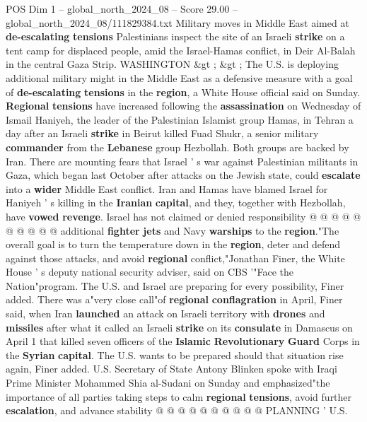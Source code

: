 \begin{textsample}{POS Dim 1 – global\_north\_2024\_08 – Score 29.00 – global\_north\_2024\_08/111829384.txt}  \label{ex:f1_pos_073}
Military moves in Middle East aimed at \textbf{de-escalating} \textbf{tensions} Palestinians inspect the site of an Israeli \textbf{strike} on a tent camp for displaced people, amid the Israel-Hamas conflict, in Deir Al-Balah in the central Gaza Strip.
WASHINGTON \&gt ; \&gt ; The U.S. is deploying additional military might in the Middle East as a defensive measure with a goal of \textbf{de-escalating} \textbf{tensions} in the \textbf{region}, a White House official said on Sunday. \textbf{Regional} \textbf{tensions} have increased following the \textbf{assassination} on Wednesday of Ismail Haniyeh, the leader of the Palestinian Islamist group Hamas, in Tehran a day after an Israeli \textbf{strike} in Beirut killed Fuad Shukr, a senior military \textbf{commander} from the \textbf{Lebanese} group Hezbollah.
Both groups are backed by Iran.
There are mounting fears that Israel ' s war against Palestinian militants in Gaza, which began last October after attacks on the Jewish state, could \textbf{escalate} into a \textbf{wider} Middle East conflict.
Iran and Hamas have blamed Israel for Haniyeh ' s killing in the \textbf{Iranian} \textbf{capital}, and they, together with Hezbollah, have \textbf{vowed} \textbf{revenge}.
Israel has not claimed or denied responsibility @ @ @ @ @ @ @ @ @ @ additional \textbf{fighter} \textbf{jets} and Navy \textbf{warships} to the \textbf{region}."The overall goal is to turn the temperature down in the \textbf{region}, deter and defend against those attacks, and avoid \textbf{regional} conflict,"Jonathan Finer, the White House ' s deputy national security adviser, said on CBS '"Face the Nation"program.
The U.S. and Israel are preparing for every possibility, Finer added.
There was a"very close call"of \textbf{regional} \textbf{conflagration} in April, Finer said, when Iran \textbf{launched} an attack on Israeli territory with \textbf{drones} and \textbf{missiles} after what it called an Israeli \textbf{strike} on its \textbf{consulate} in Damascus on April 1 that killed seven officers of the \textbf{Islamic} \textbf{Revolutionary} \textbf{Guard} Corps in the \textbf{Syrian} \textbf{capital}.
The U.S. wants to be prepared should that situation rise again, Finer added.
U.S.
Secretary of State Antony Blinken spoke with Iraqi Prime Minister Mohammed Shia al-Sudani on Sunday and emphasized"the importance of all parties taking steps to calm \textbf{regional} \textbf{tensions}, avoid further \textbf{escalation}, and advance stability @ @ @ @ @ @ @ @ @ @ PLANNING ' U.S.

\end{textsample}
